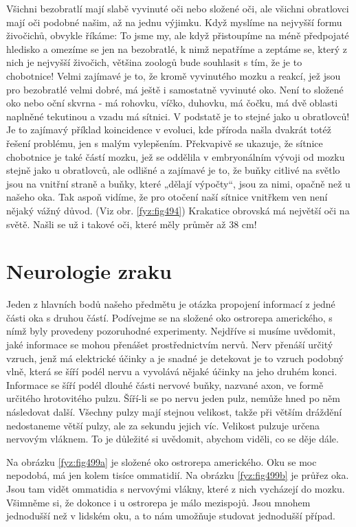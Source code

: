     Všichni bezobratlí mají slabě vyvinuté oči nebo složené oči, ale všichni obratlovci mají oči
    podobné našim, až na jednu výjimku. Když myslíme na nejvyšší formu živočichů, obvykle říkáme: To
    jsme my, ale když přistoupíme na méně předpojaté hledisko a omezíme se jen na bezobratlé, k nimž
    nepatříme a zeptáme se, který z nich je nejvyšší živočich, většina zoologů bude souhlasit s tím,
    že je to chobotnice! Velmi zajímavé je to, že kromě vyvinutého mozku a reakcí, jež jsou pro
    bezobratlé velmi dobré, má ještě i samostatně vyvinuté oko. Není to složené oko nebo oční skvrna
    - má rohovku, víčko, duhovku, má čočku, má dvě oblasti naplněné tekutinou a vzadu má sítnici. V
    podstatě je to stejné jako u obratlovců! Je to zajímavý příklad koincidence v evoluci, kde
    příroda našla dvakrát totéž řešení problému, jen s malým vylepšením. Překvapivě se ukazuje, že
    sítnice chobotnice je také částí mozku, jež se oddělila v embryonálním vývoji od mozku stejně
    jako u obratlovců, ale odlišné a zajímavé je to, že buňky citlivé na světlo jsou na vnitřní
    straně a buňky, které „dělají výpočty“, jsou za nimi, opačně než u našeho oka. Tak aspoň vidíme,
    že pro otočení naší sítnice vnitřkem ven není nějaký vážný důvod. (Viz obr. \ref{fyz:fig494})
    Krakatice obrovská má největší oči na světě. Našli se už i takové oči, které měly průměr až 38
    cm!
  
  \section{Neurologie zraku}\label{fyz:IchapXXXVIsecVI}
    Jeden z hlavních bodů našeho předmětu je otázka propojení informací z jedné části oka s druhou
    částí. Podívejme se na složené oko ostrorepa amerického, s nímž byly provedeny pozoruhodné
    experimenty. Nejdříve si musíme uvědomit, jaké informace se mohou přenášet prostřednictvím
    nervů. Nerv přenáší určitý vzruch, jenž má elektrické účinky a je snadné je detekovat je to
    vzruch podobný vlně, která se šíří podél nervu a vyvolává nějaké účinky na jeho druhém konci.
    Informace se šíří podél dlouhé části nervové buňky, nazvané axon, ve formě určitého hrotovitého
    pulzu. Šíří-li se po nervu jeden pulz, nemůže hned po něm následovat další. Všechny pulzy mají
    stejnou velikost, takže při větším dráždění nedostaneme větší pulzy, ale za sekundu jejich víc.
    Velikost pulzuje určena nervovým vláknem. To je důležité si uvědomit, abychom viděli, co se děje
    dále. 
    
    Na obrázku \ref {fyz:fig499a} je složené oko ostrorepa amerického. Oku se moc nepodobá, má jen
    kolem tisíce ommatidií. Na obrázku \ref {fyz:fig499b}  je průřez oka. Jsou tam vidět ommatidia s
    nervovými vlákny, které z nich vycházejí do mozku. Všimněme si, že dokonce i u ostrorepa je málo
    mezispojů. Jsou mnohem jednodušší než v lidském oku, a to nám umožňuje studovat jednodušší
    případ.


